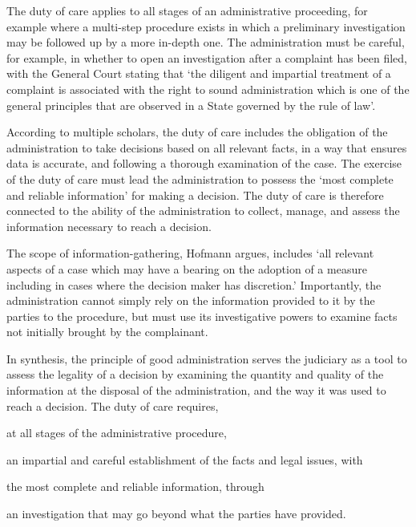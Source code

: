 The duty of care applies to all stages of an administrative proceeding, for example where a multi-step procedure exists in which a preliminary investigation may be followed up by a more in-depth one.\autocite[447]{hofmannAdministrativeLawPolicy2012} 
The administration must be careful, for example, in whether to open an investigation after a complaint has been filed, with the General Court stating that `the diligent and impartial treatment of a complaint is associated with the right to sound administration which is one of the general principles that are observed in a State governed by the rule of law'.\autocite[48]{maxMobil}

According to multiple scholars, the duty of care includes the obligation of the administration to take decisions based on all relevant facts, in a way that ensures data is accurate, and following a thorough examination of the case.\autocites[412]{tridimasGeneralPrinciplesBook2006}[35]{mustertCrossborderEnforcementGDPR}[84]{hofmannEvansRelationCharterFundamental2013}
The exercise of the duty of care must lead the administration to possess the `most complete and reliable information' for making a decision.\autocite[90]{Scott}
The duty of care is therefore connected to the ability of the administration to collect, manage, and assess the information necessary to reach a decision.\autocite[36]{mustertCrossborderEnforcementGDPR} 

The scope of information-gathering, Hofmann argues, includes `all relevant aspects of a case which may have a bearing on the adoption of a measure including in cases where the decision maker has discretion.'\autocite[98]{hofmannDutyCareEU2020}
Importantly, the administration cannot simply rely on the information provided to it by the parties to the procedure, but must use its investigative powers to examine facts not initially brought by the complainant.\autocites[62]{Sytraval}[36]{mustertCrossborderEnforcementGDPR}

In synthesis, the principle of good administration serves the judiciary as a tool to assess the legality of a decision by examining the quantity and quality of the information at the disposal of the administration, and the way it was used to reach a decision.\autocite[400]{mihaescu-evansRightGoodAdministration2015}
The duty of care requires,
\begin{enumerate*}[label=(\roman*)]
    \item at all stages of the administrative procedure,
    \item an impartial and careful establishment of the facts and legal issues, with
    \item the most complete and reliable information, through
    \item an investigation that may go beyond what the parties have provided.
\end{enumerate*}


